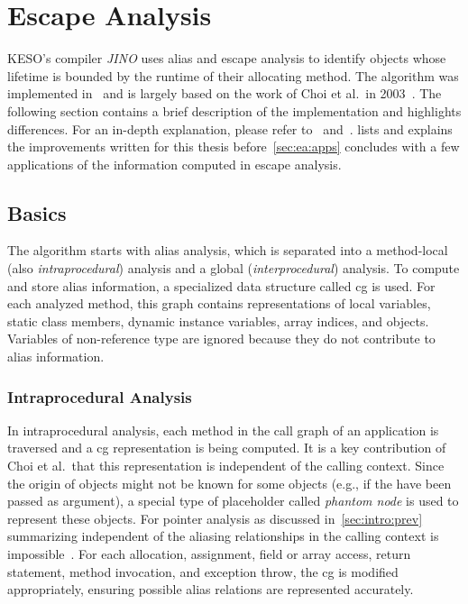 
\chapter{Escape Analysis}
	\label{chapter:ea}
	KESO's compiler \emph{JINO} uses alias and escape analysis to identify objects whose lifetime is bounded by the
	runtime of their allocating method. The algorithm was implemented in~\cite{lang:12} and is largely based on the work
	of Choi et al.\ in 2003~\cite{choi:03:toplas}. The following section contains a brief description of the
	implementation and highlights differences. For an in-depth explanation, please refer to~\cite{lang:12}
	and~\cite{choi:03:toplas}.  lists and explains the improvements written for this thesis
	before~\cref{sec:ea:apps} concludes with a few applications of the information computed in escape analysis.

	\section{Basics}
		\label{sec:ea:basics}
		The algorithm starts with alias analysis, which is separated into a method-local (also \emph{intraprocedural})
		analysis and a global (\emph{interprocedural}) analysis. To compute and store alias information, a specialized data
		structure called \gls{cg} is used. For each analyzed method, this graph contains representations of local variables,
		static class members, dynamic instance variables, array indices, and objects. Variables of non-reference type are
		ignored because they do not contribute to alias information.

		\subsection{Intraprocedural Analysis}
			\label{sub:ea:basics:local}
			In intraprocedural analysis, each method in the call graph of an application is traversed and a \gls{cg}
			representation is being computed. It is a key contribution of Choi et al.\ that this representation is independent
			of the calling context. Since the origin of objects might not be known for some objects (e.g., if the have been
			passed as argument), a special type of placeholder called \emph{phantom node} is used to represent these objects.
			For pointer analysis as discussed in~\cref{sec:intro:prev} summarizing independent of the aliasing relationships
			in the calling context is impossible~\cite[p.~886]{choi:03:toplas}. For each allocation, assignment, field or
			array access, return statement, method invocation, and exception throw, the \gls{cg} is modified appropriately,
			ensuring possible alias relations are represented accurately.

